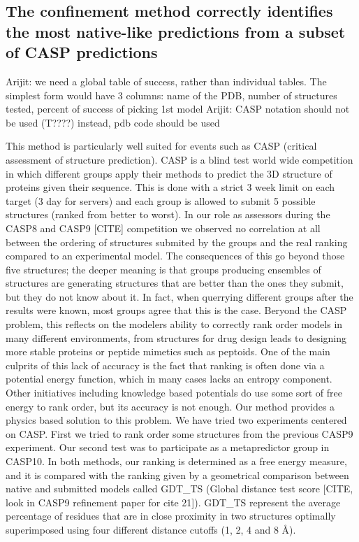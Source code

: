 \documentclass[12pt]{article}
\newcommand{\Alberto}[1]{\color{ForestGreen}#1\normalcolor }
\begin{document}
\subsection{The confinement method correctly identifies the most native-like predictions from a
subset of CASP predictions}
\Alberto{Arijit: we need a global table of success, rather than individual tables. The simplest form
    would have 3 columns: name of the PDB, number of structures tested, percent of success of
    picking 1st model}
\Alberto{Arijit: CASP notation should not be used (T????) instead, pdb code should be used}

This method is particularly well suited for events such as CASP (critical assessment of structure
prediction). CASP is a blind test world wide competition in which different groups apply their
methods to predict the 3D structure of proteins given their sequence. This is done with a strict 3
week limit on each target (3 day for servers) and each group is allowed to submit 5 possible
structures (ranked from better to worst). In our role as assessors during the CASP8 and CASP9 [CITE]
competition we observed no correlation at all between the ordering of structures submited by the
groups and the real ranking compared to an experimental model. The consequences of this go beyond
those five structures; the deeper meaning is that groups producing ensembles of structures are
generating structures that are better than the ones they submit, but they do not know about it. In
fact, when querrying different groups after the results were known, most groups agree that this is
the case. Beryond the CASP problem, this reflects on the modelers ability to correctly rank order
models in many different environments, from structures for drug design leads to designing more
stable proteins or peptide mimetics such as peptoids. One of the main culprits of this lack of
accuracy is the fact that ranking is often done via a potential energy function, which in many cases
lacks an entropy component. Other initiatives including knowledge based potentials do use some sort
of free energy to rank order, but its accuracy is not enough. Our method provides a physics based
solution to this problem. We have tried two experiments centered on CASP. First we tried to rank
order some structures from the previous CASP9 experiment. Our second test was to participate as a
metapredictor group in CASP10. In both methods, our ranking is determined as a free energy measure,
and it is compared with the ranking given by a geometrical comparison between native and submitted
models called GDT\_TS (Global distance test score [CITE, look in CASP9 refinement paper for cite
21]). GDT\_TS represent the average percentage of residues that are in close proximity in two
structures optimally superimposed using four different distance cutoffs (1, 2, 4 and 8 Å).
\end{document}
